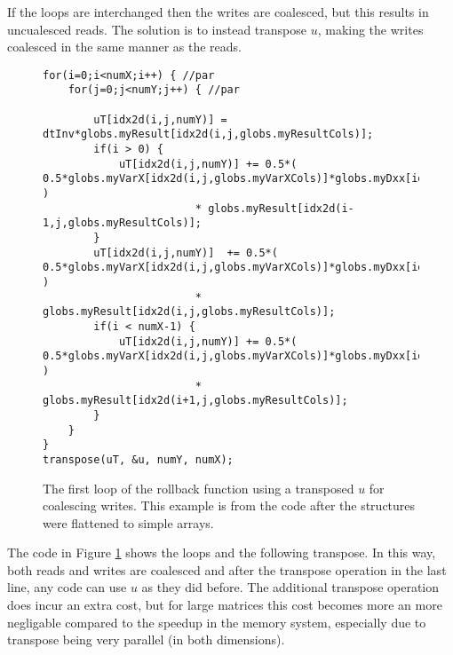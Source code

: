 If the loops are interchanged then the writes are coalesced, but this results in uncualesced reads. The solution is to instead transpose $u$, making the writes coalesced in the same manner as the reads.

\begin{figure}[H]
    \begin{lstlisting}
for(i=0;i<numX;i++) { //par
    for(j=0;j<numY;j++) { //par

        uT[idx2d(i,j,numY)] = dtInv*globs.myResult[idx2d(i,j,globs.myResultCols)];
        if(i > 0) {
            uT[idx2d(i,j,numY)] += 0.5*( 0.5*globs.myVarX[idx2d(i,j,globs.myVarXCols)]*globs.myDxx[idx2d(i,0,globs.myDxxCols)] )
                        * globs.myResult[idx2d(i-1,j,globs.myResultCols)];
        }
        uT[idx2d(i,j,numY)]  += 0.5*( 0.5*globs.myVarX[idx2d(i,j,globs.myVarXCols)]*globs.myDxx[idx2d(i,1,globs.myDxxCols)] )
                        * globs.myResult[idx2d(i,j,globs.myResultCols)];
        if(i < numX-1) {
            uT[idx2d(i,j,numY)] += 0.5*( 0.5*globs.myVarX[idx2d(i,j,globs.myVarXCols)]*globs.myDxx[idx2d(i,2,globs.myDxxCols)] )
                        * globs.myResult[idx2d(i+1,j,globs.myResultCols)];
        }
    }
}
transpose(uT, &u, numY, numX);
    \end{lstlisting}
    \caption{The first loop of the rollback function using a transposed $u$ for
    coalescing writes. This example is from the code after the structures were
    flattened to simple arrays.}
    \label{code:coal2}
\end{figure}

The code in Figure \ref{code:coal2} shows the loops and the following transpose.
In this way, both reads and writes are coalesced and after the transpose
operation in the last line, any code can use $u$ as they did before. The
additional transpose operation does incur an extra cost, but for large matrices
this cost becomes more an more negligable compared to the speedup in the memory
system, especially due to transpose being very parallel (in both dimensions).